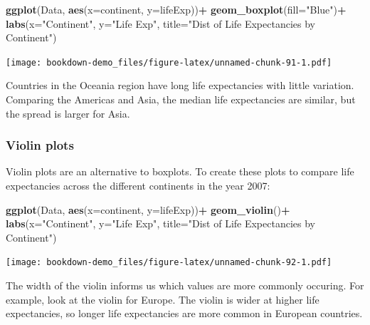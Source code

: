 \documentclass[
]{book}
\newenvironment{Shaded}{\begin{snugshade}}{\end{snugshade}}
\newcommand{\AttributeTok}[1]{\textcolor[rgb]{0.13,0.29,0.53}{#1}}
\newcommand{\FunctionTok}[1]{\textcolor[rgb]{0.13,0.29,0.53}{\textbf{#1}}}
\newcommand{\NormalTok}[1]{#1}
\newcommand{\SpecialCharTok}[1]{\textcolor[rgb]{0.81,0.36,0.00}{\textbf{#1}}}
\newcommand{\StringTok}[1]{\textcolor[rgb]{0.31,0.60,0.02}{#1}}
\begin{document}
\begin{Shaded}
\begin{Highlighting}[]
\FunctionTok{ggplot}\NormalTok{(Data, }\FunctionTok{aes}\NormalTok{(}\AttributeTok{x=}\NormalTok{continent, }\AttributeTok{y=}\NormalTok{lifeExp))}\SpecialCharTok{+}
  \FunctionTok{geom\_boxplot}\NormalTok{(}\AttributeTok{fill=}\StringTok{"Blue"}\NormalTok{)}\SpecialCharTok{+}
  \FunctionTok{labs}\NormalTok{(}\AttributeTok{x=}\StringTok{"Continent"}\NormalTok{, }\AttributeTok{y=}\StringTok{"Life Exp"}\NormalTok{, }\AttributeTok{title=}\StringTok{"Dist of Life Expectancies by Continent"}\NormalTok{)}
\end{Highlighting}
\end{Shaded}

\texttt{[image: bookdown-demo\_files/figure-latex/unnamed-chunk-91-1.pdf]}

Countries in the Oceania region have long life expectancies with little variation. Comparing the Americas and Asia, the median life expectancies are similar, but the spread is larger for Asia.

\hypertarget{violin-plots}{%
\subsubsection{Violin plots}\label{violin-plots}}

Violin plots are an alternative to boxplots. To create these plots to compare life expectancies across the different continents in the year 2007:

\begin{Shaded}
\begin{Highlighting}[]
\FunctionTok{ggplot}\NormalTok{(Data, }\FunctionTok{aes}\NormalTok{(}\AttributeTok{x=}\NormalTok{continent, }\AttributeTok{y=}\NormalTok{lifeExp))}\SpecialCharTok{+}
  \FunctionTok{geom\_violin}\NormalTok{()}\SpecialCharTok{+}
  \FunctionTok{labs}\NormalTok{(}\AttributeTok{x=}\StringTok{"Continent"}\NormalTok{, }\AttributeTok{y=}\StringTok{"Life Exp"}\NormalTok{, }\AttributeTok{title=}\StringTok{"Dist of Life Expectancies by Continent"}\NormalTok{)}
\end{Highlighting}
\end{Shaded}

\texttt{[image: bookdown-demo\_files/figure-latex/unnamed-chunk-92-1.pdf]}

The width of the violin informs us which values are more commonly occuring. For example, look at the violin for Europe. The violin is wider at higher life expectancies, so longer life expectancies are more common in European countries.
\end{document}
